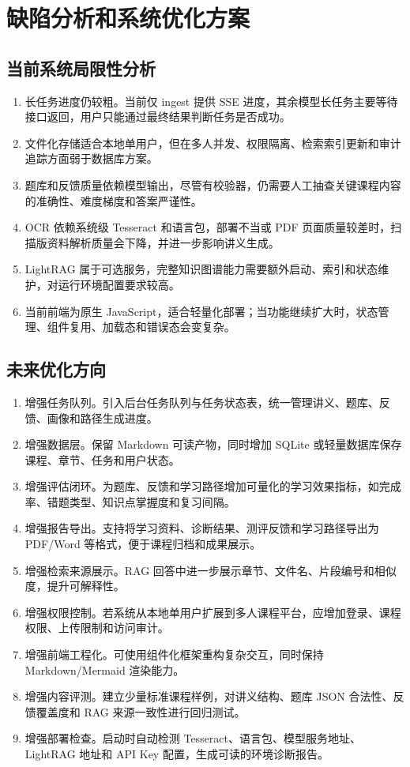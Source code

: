 \documentclass[UTF8,fontset=windows,zihao=-4,openany]{ctexrep}
\begin{document}
\chapter{缺陷分析和系统优化方案}

\section{当前系统局限性分析}

\begin{enumerate}
  \item 长任务进度仍较粗。当前仅 ingest 提供 SSE 进度，其余模型长任务主要等待接口返回，用户只能通过最终结果判断任务是否成功。
  \item 文件化存储适合本地单用户，但在多人并发、权限隔离、检索索引更新和审计追踪方面弱于数据库方案。
  \item 题库和反馈质量依赖模型输出，尽管有校验器，仍需要人工抽查关键课程内容的准确性、难度梯度和答案严谨性。
  \item OCR 依赖系统级 Tesseract 和语言包，部署不当或 PDF 页面质量较差时，扫描版资料解析质量会下降，并进一步影响讲义生成。
  \item LightRAG 属于可选服务，完整知识图谱能力需要额外启动、索引和状态维护，对运行环境配置要求较高。
  \item 当前前端为原生 JavaScript，适合轻量化部署；当功能继续扩大时，状态管理、组件复用、加载态和错误态会变复杂。
\end{enumerate}

\section{未来优化方向}

\begin{enumerate}
  \item 增强任务队列。引入后台任务队列与任务状态表，统一管理讲义、题库、反馈、画像和路径生成进度。
  \item 增强数据层。保留 Markdown 可读产物，同时增加 SQLite 或轻量数据库保存课程、章节、任务和用户状态。
  \item 增强评估闭环。为题库、反馈和学习路径增加可量化的学习效果指标，如完成率、错题类型、知识点掌握度和复习间隔。
  \item 增强报告导出。支持将学习资料、诊断结果、测评反馈和学习路径导出为 PDF/Word 等格式，便于课程归档和成果展示。
  \item 增强检索来源展示。RAG 回答中进一步展示章节、文件名、片段编号和相似度，提升可解释性。
  \item 增强权限控制。若系统从本地单用户扩展到多人课程平台，应增加登录、课程权限、上传限制和访问审计。
  \item 增强前端工程化。可使用组件化框架重构复杂交互，同时保持 Markdown/Mermaid 渲染能力。
  \item 增强内容评测。建立少量标准课程样例，对讲义结构、题库 JSON 合法性、反馈覆盖度和 RAG 来源一致性进行回归测试。
  \item 增强部署检查。启动时自动检测 Tesseract、语言包、模型服务地址、LightRAG 地址和 API Key 配置，生成可读的环境诊断报告。
\end{enumerate}
\end{document}
